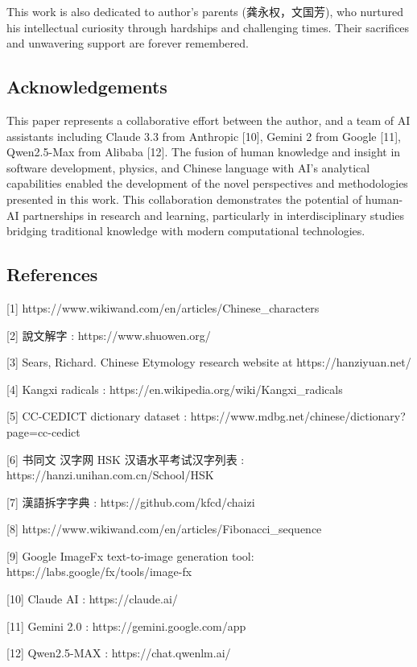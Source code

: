 This work is also dedicated to author's parents (龚永权，文国芳), who
nurtured his intellectual curiosity through hardships and challenging
times. Their sacrifices and unwavering support are forever remembered.

\hypertarget{acknowledgements}{%
\subsection{Acknowledgements}\label{acknowledgements}}

This paper represents a collaborative effort between the author, and a
team of AI assistants including Claude 3.3 from Anthropic
{[}10{]}, Gemini 2 from Google {[}11{]},
Qwen2.5-Max from Alibaba {[}12{]}. The fusion of human
knowledge and insight in software development, physics, and Chinese
language with AI's analytical capabilities enabled the development of
the novel perspectives and methodologies presented in this work. This
collaboration demonstrates the potential of human-AI partnerships in
research and learning, particularly in interdisciplinary studies
bridging traditional knowledge with modern computational technologies.

\hypertarget{references}{%
\subsection{References}\label{references}}

{[}1{]} https://www.wikiwand.com/en/articles/Chinese\_characters

{[}2{]} 說文解字 : https://www.shuowen.org/

{[}3{]} Sears, Richard. Chinese Etymology research website at
https://hanziyuan.net/

{[}4{]} Kangxi radicals :
https://en.wikipedia.org/wiki/Kangxi\_radicals

{[}5{]} CC-CEDICT dictionary dataset :
https://www.mdbg.net/chinese/dictionary?page=cc-cedict

{[}6{]} 书同文 汉字网 HSK 汉语水平考试汉字列表 :
https://hanzi.unihan.com.cn/School/HSK

{[}7{]} 漢語拆字字典 : https://github.com/kfcd/chaizi

{[}8{]}
https://www.wikiwand.com/en/articles/Fibonacci\_sequence

{[}9{]} Google ImageFx text-to-image generation tool:
https://labs.google/fx/tools/image-fx

{[}10{]} Claude AI : https://claude.ai/

{[}11{]} Gemini 2.0 : https://gemini.google.com/app

{[}12{]} Qwen2.5-MAX : https://chat.qwenlm.ai/
